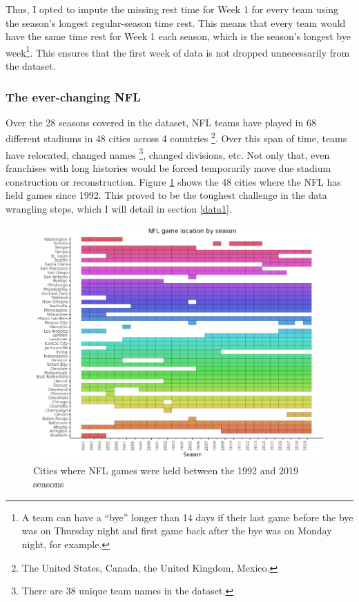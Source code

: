 \documentclass[12pt, letterpaper, twoside]{article}
\begin{document}
Thus, I opted to impute the missing rest time for Week 1 for every team using the season's longest regular-season time rest. This means that every team would have the same time rest for Week 1 each season, which is the season's longest bye week\footnote{A team can have a ``bye'' longer than 14 days if their last game before the bye was on Thursday night and first game back after the bye was on Monday night, for example.}. This ensures that the first week of data is not dropped unnecessarily from the dataset.

\subsubsection{The ever-changing NFL}

Over the 28 seasons covered in the dataset, NFL teams have played in 68 different stadiums in 48 cities across 4 countries \footnote{The United States, Canada, the United Kingdom, Mexico.}. Over this span of time, teams have relocated, changed names \footnote{There are 38 unique team names in the dataset.}, changed divisions, etc. Not only that, even franchises with long histories would be forced temporarily move due stadium construction or reconstruction. Figure \ref{fig:city} shows the 48 cities where the NFL has held games since 1992. This proved to be the toughest challenge in the data wrangling steps, which I will detail in section \ref{data1}. 

\begin{figure}[H]%
   \includegraphics[width=\linewidth]{../09_figures/plot_city.png} 
    \caption{Cities where NFL games were held between the 1992 and 2019 seasons}
    \label{fig:city}%
\end{figure}
\end{document}
